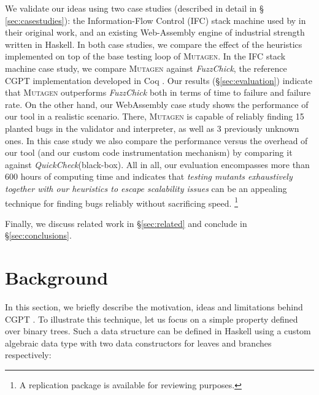 \documentclass[sigconf,review,anonymous]{acmart}
\newcommand{\quickcheck}{\textit{QuickCheck}\xspace}
\newcommand{\fuzzchick}{\textit{FuzzChick}\xspace}
\newcommand{\mutagen}{\textsc{Mutagen}\xspace}
\begin{document}
We validate our ideas using two case studies (described in detail in \S
\ref{sec:casestudies}): the Information-Flow Control (IFC) stack machine used by
\citeauthor{lampropoulos2019coverage} in their original work, and an existing
{Web-Assembly} engine of industrial strength written in Haskell.
%
In both case studies, we compare the effect of the heuristics implemented on top
of the base testing loop of \mutagen.
%
In the IFC stack machine case study, we compare \mutagen against \fuzzchick, the
reference CGPT implementation developed in Coq \cite{lampropoulos2019coverage}.
%
Our results (\S \ref{sec:evaluation}) indicate that \mutagen outperforms
\fuzzchick both in terms of time to failure and failure rate.
%
On the other hand, our WebAssembly case study shows the performance of our tool
in a realistic scenario.
%
There, \mutagen is capable of reliably finding 15 planted bugs in the validator
and interpreter, as well as 3 previously unknown ones.
%
In this case study we also compare the performance versus the overhead of our
tool (and our custom code instrumentation mechanism) by comparing it against
\quickcheck (black-box).  
%
All in all, our evaluation encompasses more than 600 hours of computing time and
indicates that \emph{testing mutants exhaustively together with our heuristics
to escape scalability issues} can be an appealing technique for finding bugs
reliably without sacrificing speed.%
%
\footnote{A replication package \cite{anon_2021} is available for reviewing
  purposes.}

Finally, we discuss related work in \S \ref{sec:related} and conclude
in \S \ref{sec:conclusions}.



\section{Background}
\label{sec:background}

In this section, we briefly describe the motivation, ideas and limitations
behind CGPT \cite{lampropoulos2019coverage}.
%
To illustrate this technique, let us focus on a simple property defined over
binary trees.
%
Such a data structure can be defined in Haskell using a custom algebraic data
type with two data constructors for leaves and branches respectively:
\end{document}
